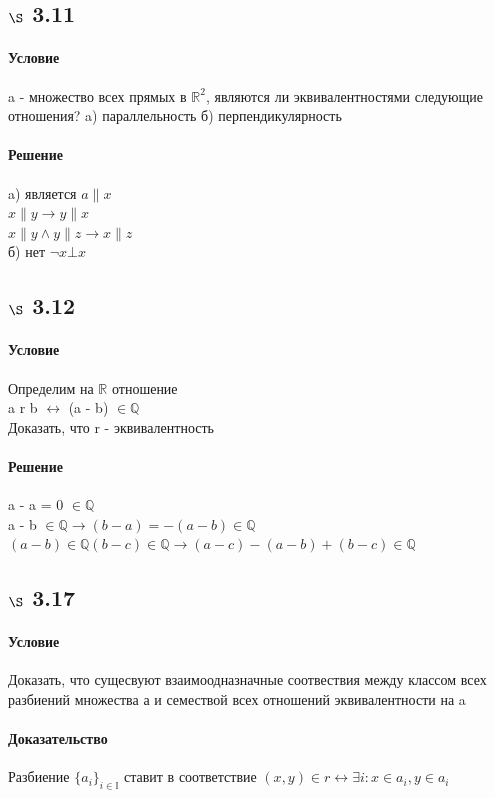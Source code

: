\documentclass[a4paper,12pt]{article}
\begin{document}
\subsection*{$\S$ 3.11}
\paragraph*{Условие}
a - множество всех прямых в $\mathbb{R}^2$, являются ли эквивалентностями следующие отношения?
a) параллельность
б) перпендикулярность
\paragraph*{Решение}
a) является $ a \parallel x $\\
$ x \parallel y \rightarrow y \parallel x$\\
$ x \parallel y \wedge  y \parallel z \rightarrow x \parallel z $\\
б) нет $ \neg x \bot x $ 

\subsection*{$\S$ 3.12}
\paragraph*{Условие}
Определим на $\mathbb{R}$ отношение\\
 a r b $\leftrightarrow$ (a - b) $ \in \mathbb{Q}$\\
Доказать, что r - эквивалентность
\paragraph*{Решение}
a - a = 0 $ \in \mathbb{Q}$\\
a - b $ \in \mathbb{Q} \rightarrow (b - a)=-(a - b) \in \mathbb{Q}$\\
$(a - b) \in \mathbb{Q} (b - c)  \in \mathbb{Q} \rightarrow (a - c) - (a - b) + (b - c) \in \mathbb{Q}$ 

\subsection*{$\S$ 3.17}
\paragraph*{Условие}
Доказать, что сущесвуют взаимоодназначные соотвествия между классом всех разбиений множества а и семествой всех отношений эквивалентности на a
\paragraph*{Доказательство}
Разбиение $\{a_i\}_{i\in\mathbb{I}}$ ставит в соответствие $(x, y) \in r \leftrightarrow \exists i: x \in a_i , y \in a_i$
\end{document}
